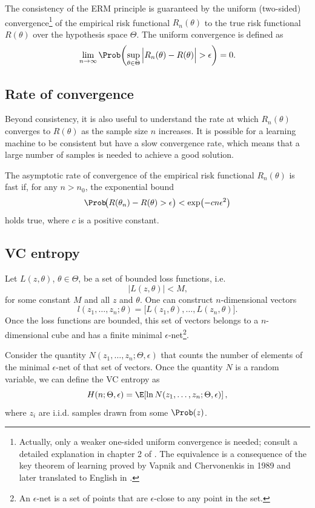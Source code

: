 The consistency of the ERM principle is guaranteed by the uniform (two-sided)
convergence\footnote{Actually, only a weaker one-sided uniform convergence is needed; consult a
detailed explanation in chapter 2 of .  The equivalence is a
consequence of the key theorem of learning proved by Vapnik and Chervonenkis in 1989 and
later translated to English in .} of the empirical risk functional
$R_n(\theta)$ to the true risk functional $R(\theta)$ over the hypothesis space $\Theta$.
The uniform convergence is defined as
\[
  \lim_{n \to \infty} \Prob\!\left(
    \sup_{\theta \in \Theta} \Big| R_n(\theta) - R(\theta) \Big| > \epsilon
  \right) = 0\text{.}
\]

\subsection{Rate of convergence}

Beyond consistency, it is also useful to understand the rate at which $R_n(\theta)$
converges to $R(\theta)$ as the sample size $n$ increases.  It is possible for a learning
machine to be consistent but have a slow convergence rate, which means that a large number of
samples is needed to achieve a good solution.

The asymptotic rate of convergence of the empirical risk functional $R_n(\theta)$ is
fast if, for any $n > n_0$, the exponential bound
\[
  \Prob\!\big(R(\theta_n) - R(\theta) > \epsilon\big) < \exp\!\left( - c n \epsilon^2 \right)
\]
holds true, where $c$ is a positive constant.

\subsection{VC entropy}

Let $L(z, \theta)$, $\theta \in \Theta$, be a set of bounded loss functions, i.e.
\[
  \left| L(z, \theta) \right| < M\text{,}
\]
for some constant $M$ and all $z$ and $\theta$.  One can construct $n$-dimensional vectors
\[
  l(z_1, \dots, z_n; \theta) = \big[ L(z_1, \theta), \dots, L(z_n, \theta) \big]\text{.}
\]
Once the loss functions are bounded, this set of vectors belongs to a $n$-dimensional
cube and has a finite minimal $\epsilon$-net\footnote{An $\epsilon$-net is a set of points
that are $\epsilon$-close to any point in the set.}.

Consider the quantity $N(z_1, \dots, z_n; \Theta, \epsilon)$ that counts the number of
elements of the minimal $\epsilon$-net of that set of vectors.
Once the quantity $N$ is a random variable, we can define the VC entropy as
\[
  H(n; \Theta, \epsilon) = \E\!\left[ \ln N(z_1, \dots, z_n; \Theta, \epsilon) \right]\text{,}
\]
where $z_i$ are i.i.d. samples drawn from some $\Prob(z)$.

